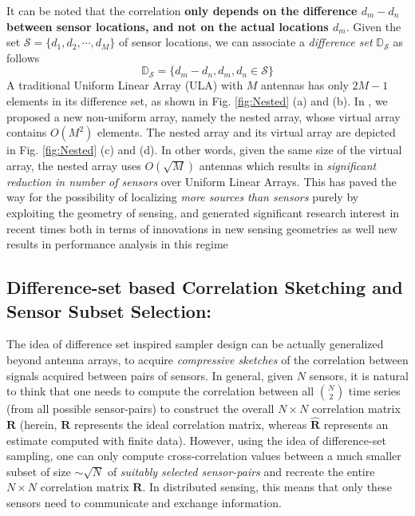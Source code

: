 It can be noted that the correlation {\bf only depends on the difference $d_m-d_n$ between sensor locations, and not on the actual locations $d_m$}. %
Given the set $\mathcal{S} = \{d_1,d_2,\cdots, d_M\} $ of sensor locations,  we can associate a {\em difference set} $\mathbb{D}_{\mathcal{S}}$ as follows \[ \mathbb{D}_{\mathcal{S}}=\{d_m-d_n, d_m, d_n\in \mathcal{S} \} \] 
A traditional Uniform Linear Array (ULA) with $M$ antennas has only $2M-1$ elements in its difference set, as shown in Fig. \ref{fig:Nested} (a) and (b). In \cite{PiyaNested}, we proposed a new non-uniform array, namely the nested array, whose virtual array contains $O(M^2)$ elements. 
The nested array and its virtual array are depicted in Fig. \ref{fig:Nested} (c) and (d). In other words, given the same size of the virtual array, the nested array uses $O(\sqrt{M})$ antennas which results in {\em significant reduction in number of sensors} over Uniform Linear Arrays. This has paved the way for the possibility of localizing {\em more sources than sensors} purely by exploiting the geometry of sensing, and generated significant research interest in recent times both in terms of innovations in new sensing geometries \cite{} as well new results in performance analysis in this regime \cite{}
\subsection{Difference-set based Correlation Sketching and Sensor Subset Selection:} 
The idea of difference set inspired sampler design can be actually generalized beyond  antenna arrays, to acquire {\em compressive sketches} of the correlation between signals acquired between pairs of sensors. In general, given $N$ sensors, it is natural to think that one needs to compute the correlation between all $N\choose 2$ time series (from all possible sensor-pairs) to construct the overall $N\times N$ correlation matrix $\mathbf{R}$
(herein, $\mathbf{R}$ represents the ideal correlation matrix, whereas $\mathbf{\hat{R}}$ represents an estimate  computed with finite data).
However, using the idea of difference-set sampling, one can only compute  cross-correlation values between a much smaller subset of size $\sim\sqrt{N}$ of {\em suitably selected sensor-pairs} and recreate the entire $N\times N$ correlation matrix $\mathbf{R}$. In distributed sensing, this  means that only these sensors need to communicate and exchange information.


